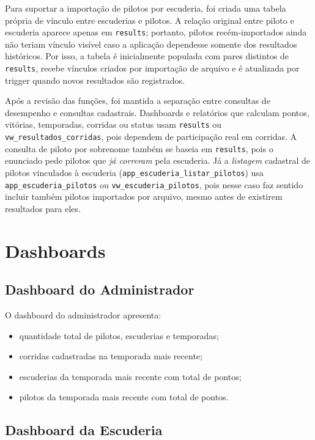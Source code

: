 \documentclass[12pt,a4paper]{article}
\begin{document}
Para suportar a importação de pilotos por escuderia, foi criada uma tabela própria de vínculo entre escuderias e pilotos. A relação original entre piloto e escuderia aparece apenas em \texttt{results}; portanto, pilotos recém-importados ainda não teriam vínculo visível caso a aplicação dependesse somente dos resultados históricos. Por isso, a tabela é inicialmente populada com pares distintos de \texttt{results}, recebe vínculos criados por importação de arquivo e é atualizada por trigger quando novos resultados são registrados.

Após a revisão das funções, foi mantida a separação entre consultas de desempenho e consultas cadastrais. Dashboards e relatórios que calculam pontos, vitórias, temporadas, corridas ou status usam \texttt{results} ou \texttt{vw\_resultados\_corridas}, pois dependem de participação real em corridas. A consulta de piloto por sobrenome também se baseia em \texttt{results}, pois o enunciado pede pilotos que \emph{já correram} pela escuderia. Já a \emph{listagem} cadastral de pilotos vinculados à escuderia (\texttt{app\_escuderia\_listar\_pilotos}) usa \texttt{app\_escuderia\_pilotos} ou \texttt{vw\_escuderia\_pilotos}, pois nesse caso faz sentido incluir também pilotos importados por arquivo, mesmo antes de existirem resultados para eles.

\section{Dashboards}

\subsection{Dashboard do Administrador}

O dashboard do administrador apresenta:

\begin{itemize}
    \item quantidade total de pilotos, escuderias e temporadas;
    \item corridas cadastradas na temporada mais recente;
    \item escuderias da temporada mais recente com total de pontos;
    \item pilotos da temporada mais recente com total de pontos.
\end{itemize}

\subsection{Dashboard da Escuderia}
\end{document}
